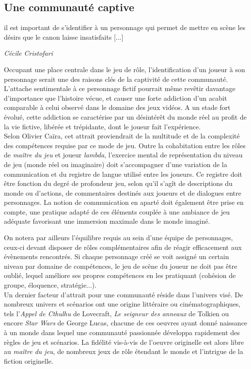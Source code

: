 \subsection{Une communauté captive}

\begin{shadequote}
[...] il est important de s’identifier à un personnage qui permet de mettre en scène les désirs que le canon laisse insatisfaits [...]
\par\emph{C{\'e}cile Cristofari}
\end{shadequote}

Occupant une place centrale dans le jeu de rôle, l'identification d'un joueur à son personnage serait une des raisons clés de la captivité de cette communauté. L'attache sentimentale à ce personnage fictif pourrait même revêtir davantage d'importance que l'histoire vécue, et causer une forte addiction d'un acabit comparable à celui observé dans le domaine des jeux vidéos. A un stade fort évolué, cette addiction se caractérise par un désintérêt du monde réel au profit de la vie fictive, libérée et trépidante, dont le joueur fait l'expérience.\\


Selon Olivier Caïra\cite{caira2007jeux}, cet attrait proviendrait de la multitude et de la complexité des compétences requise par ce mode de jeu. Outre la cohabitation entre les rôles de \textit{maître du jeu} et joueur \textit{lambda}, l'exercice mental de représentation du niveau de jeu (monde réel ou imaginaire) doit s'accompagner d'une variation de la communication et du registre de langue utilisé entre les joueurs. Ce registre doit être fonction du degré de profondeur jeu, selon qu'il s'agît de descriptions du monde ou d'actions, de commentaires destinés aux joueurs et de dialogues entre personnages. La notion de communication en aparté doit également être prise en compte, une pratique adapté de ces éléments couplée à une ambiance de jeu adéquate favorisant une immersion maximale dans le monde imaginé.

On notera par ailleurs l'équilibre requis au sein d'une équipe de personnages, ceux-ci devant disposer de rôles complémentaires afin de réagir efficacement aux évènements rencontrés. Si chaque personnage créé se voit assigné un certain niveau par domaine de compétences, le jeu de scène du joueur ne doit pas être oublié, lequel améliore ses propres compétences en les pratiquant (cohésion de groupe, éloquence, stratégie...).\\


Un dernier facteur d'attrait pour une communauté réside dans l'univers visé. De nombreux univers et scénarios ont une origine littéraire ou cinématographiques, tels l'\textit{Appel de Cthulhu} de Lovecraft, \textit{Le seigneur des anneaux} de Tolkien ou encore \textit{Star Wars} de George Lucas, chacune de ces oeuvres ayant donné naissance à un monde dans lequel une communauté passionnée développa rapidement des règles de jeu et scénarios. La fidélité vis-à-vis de l'oeuvre originelle est alors libre au \textit{maître du jeu}, de nombreux jeux de rôle étendant le monde et l'intrigue de la fiction originelle.

\clearpage
